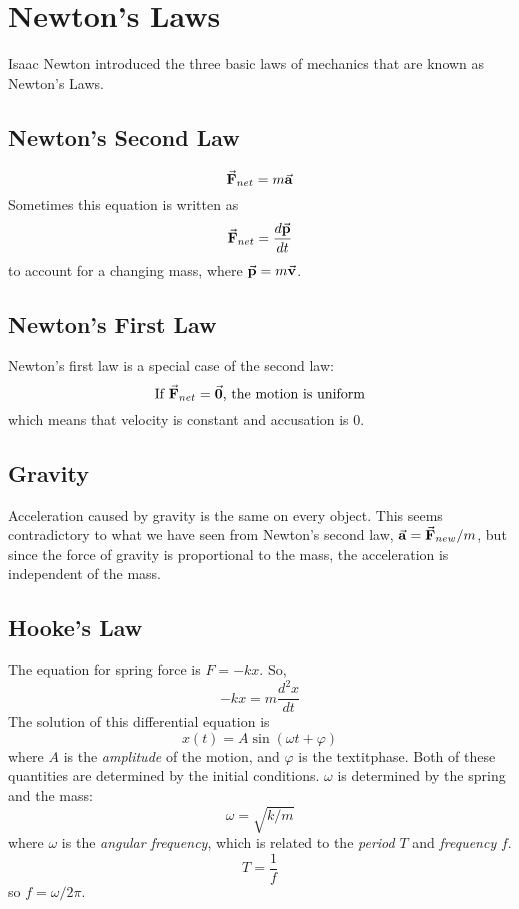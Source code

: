 \section{Newton's Laws}
    \indent Isaac Newton introduced the three basic laws of mechanics that are known as Newton's Laws.
    \subsection*{Newton's Second Law}
        \begin{equation*}
            \va{F}_{net} = m\va{a}
        \end{equation*}
        Sometimes this equation is written as
        \begin{equation*}
            \va{F}_{net} = \frac{d\va{p}}{dt}
        \end{equation*}
        to account for a changing mass, where $\va{p} = m\va{v}$. 
    \subsection*{Newton's First Law}
        Newton's first law is a special case of the second law:
        \begin{equation*}
            \text{If $\va{F}_{net} = \va{0}$, the motion is uniform}
        \end{equation*}
        which means that velocity is constant and accusation is 0.
    \subsection*{Gravity}
        Acceleration caused by gravity is the same on every object. This seems contradictory to what we have seen from Newton's second law, $\va{a} = \va{F}_{new} / m$, but since the force of gravity is proportional to the mass, the acceleration is independent of the mass.
    \subsection*{Hooke's Law}
        The equation for spring force is $F = -kx$. So,
        \begin{equation*}
            -kx = m\frac{d^2x}{dt}
        \end{equation*}
        The solution of this differential equation is 
        \begin{equation*}
            x(t) = A\sin(\omega t + \varphi)
        \end{equation*}
        where $A$ is the \textit{amplitude} of the motion, and $\varphi$ is the textit{phase}. Both of these quantities are determined by the initial conditions. $\omega$ is determined by the spring and the mass:
        \begin{equation*}
            \omega = \sqrt{k / m}
        \end{equation*}
        where $\omega$ is the \textit{angular frequency}, which is related to the \textit{period} $T$ and \textit{frequency} $f$. 
        \begin{equation*}
            T = \frac{1}{f}
        \end{equation*}
        so $f = \omega/2\pi$.
